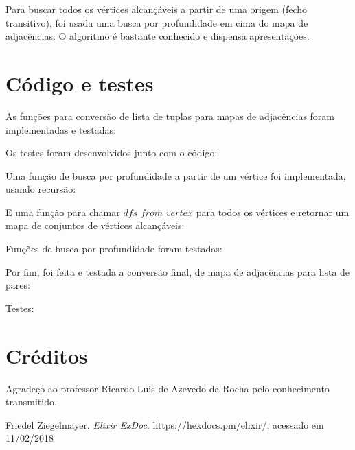 \documentclass[conference]{IEEEtran}
\begin{document}
Para buscar todos os vértices alcançáveis a partir de uma origem (fecho transitivo), foi usada uma busca por profundidade em cima do mapa de adjacências. O algoritmo é bastante conhecido e dispensa apresentações.

\section{Código e testes}

As funções para conversão de lista de tuplas para mapas de adjacências foram implementadas e testadas:



Os testes foram desenvolvidos junto com o código:



Uma função de busca por profundidade a partir de um vértice foi implementada, usando recursão:



E uma função para chamar $dfs\_from\_vertex$ para todos os vértices e retornar um mapa de conjuntos de vértices alcançáveis:



Funções de busca por profundidade foram testadas:



Por fim, foi feita e testada a conversão final, de mapa de adjacências para lista de pares:



Testes:



\section{Créditos}
Agradeço ao professor Ricardo Luis de Azevedo da Rocha pelo conhecimento transmitido.

\begin{thebibliography}{1}
Friedel Ziegelmayer. \emph{Elixir ExDoc}. https://hexdocs.pm/elixir/, acessado em 11/02/2018
\end{thebibliography}
\end{document}
